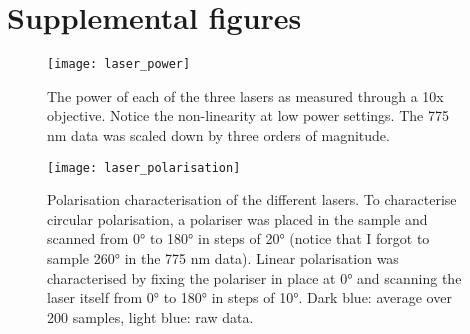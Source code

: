 \chapter{Supplemental figures}


\begin{figure}[ht]
	\centering
	\texttt{[image: laser\_power]}
	\caption{
		The power of each of the three lasers as measured through a 10x objective. Notice the non-linearity at low power settings. The 775 nm data was scaled down by three orders of magnitude. 
	}
	\label{fig:laser power}
\end{figure}

\begin{figure}
	\centering
	\texttt{[image: laser\_polarisation]}
	\caption{
		Polarisation characterisation of the different lasers. To characterise circular polarisation, a polariser was placed in the sample and scanned from \ang{0} to \ang{180} in steps of \ang{20} (notice that I forgot to sample \ang{260} in the 775 nm data). Linear polarisation was characterised by fixing the polariser in place at \ang{0} and scanning the laser itself from \ang{0} to \ang{180} in steps of \ang{10}. Dark blue: average over 200 samples, light blue: raw data. 
	}
	\label{fig:laser polarisation}
\end{figure}
%
%

